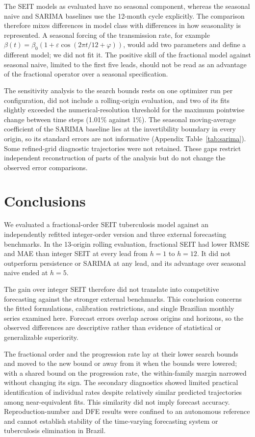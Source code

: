 \documentclass[pdflatex,sn-mathphys-ay]{sn-jnl}
\begin{document}
The SEIT models as evaluated have no seasonal component, whereas the seasonal naive and SARIMA baselines use the 12-month cycle explicitly. The comparison therefore mixes differences in model class with differences in how seasonality is represented. A seasonal forcing of the transmission rate, for example $\beta(t)=\beta_0\left(1+\varepsilon\cos(2\pi t/12+\varphi)\right)$, would add two parameters and define a different model; we did not fit it. The positive skill of the fractional model against seasonal naive, limited to the first five leads, should not be read as an advantage of the fractional operator over a seasonal specification.

The sensitivity analysis to the search bounds rests on one optimizer run per configuration, did not include a rolling-origin evaluation, and two of its fits slightly exceeded the numerical-resolution threshold for the maximum pointwise change between time steps (1.01\% against 1\%). The seasonal moving-average coefficient of the SARIMA baseline lies at the invertibility boundary in every origin, so its standard errors are not informative (Appendix Table~\ref{tab:sarima}). Some refined-grid diagnostic trajectories were not retained. These gaps restrict independent reconstruction of parts of the analysis but do not change the observed error comparisons.

\section{Conclusions}

We evaluated a fractional-order SEIT tuberculosis model against an independently refitted integer-order version and three external forecasting benchmarks. In the 13-origin rolling evaluation, fractional SEIT had lower RMSE and MAE than integer SEIT at every lead from $h=1$ to $h=12$. It did not outperform persistence or SARIMA at any lead, and its advantage over seasonal naive ended at $h=5$.

The gain over integer SEIT therefore did not translate into competitive forecasting against the stronger external benchmarks. This conclusion concerns the fitted formulations, calibration restrictions, and single Brazilian monthly series examined here. Forecast errors overlap across origins and horizons, so the observed differences are descriptive rather than evidence of statistical or generalizable superiority.

The fractional order and the progression rate lay at their lower search bounds and moved to the new bound or away from it when the bounds were lowered; with a shared bound on the progression rate, the within-family margin narrowed without changing its sign. The secondary diagnostics showed limited practical identification of individual rates despite relatively similar predicted trajectories among near-equivalent fits. This similarity did not imply forecast accuracy. Reproduction-number and DFE results were confined to an autonomous reference and cannot establish stability of the time-varying forecasting system or tuberculosis elimination in Brazil.
\end{document}
